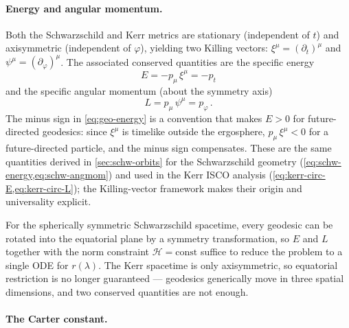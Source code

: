 \paragraph{Energy and angular momentum.}

Both the Schwarzschild and Kerr metrics are stationary (independent of $t$)
and axisymmetric (independent of $\varphi$), yielding two Killing vectors:
$\xi^\mu = (\partial_t)^\mu$ and $\psi^\mu = (\partial_\varphi)^\mu$.  The
associated conserved quantities are the specific energy
%
\begin{equation}
  E = -p_\mu\,\xi^\mu = -p_t
  \label{eq:geo-energy}
\end{equation}
%
and the specific angular momentum (about the symmetry axis)
%
\begin{equation}
  L = p_\mu\,\psi^\mu = p_\varphi \,.
  \label{eq:geo-angmom}
\end{equation}
%
The minus sign in \cref{eq:geo-energy} is a convention that makes $E > 0$
for future-directed geodesics: since $\xi^\mu$ is timelike outside the
ergosphere, $p_\mu\,\xi^\mu < 0$ for a future-directed particle, and the
minus sign compensates.  These are the same quantities derived in
\cref{sec:schw-orbits} for the Schwarzschild geometry
(\cref{eq:schw-energy,eq:schw-angmom}) and used in the Kerr ISCO analysis
(\cref{eq:kerr-circ-E,eq:kerr-circ-L}); the Killing-vector framework makes
their origin and universality explicit.

For the spherically symmetric Schwarzschild spacetime, every geodesic can be
rotated into the equatorial plane by a symmetry transformation, so $E$ and
$L$ together with the norm constraint $\mathcal{H} = \text{const}$ suffice
to reduce the problem to a single ODE for $r(\lambda)$.  The Kerr spacetime
is only axisymmetric, so equatorial restriction is no longer guaranteed ---
geodesics generically move in three spatial dimensions, and two conserved
quantities are not enough.

\paragraph{The Carter constant.}

